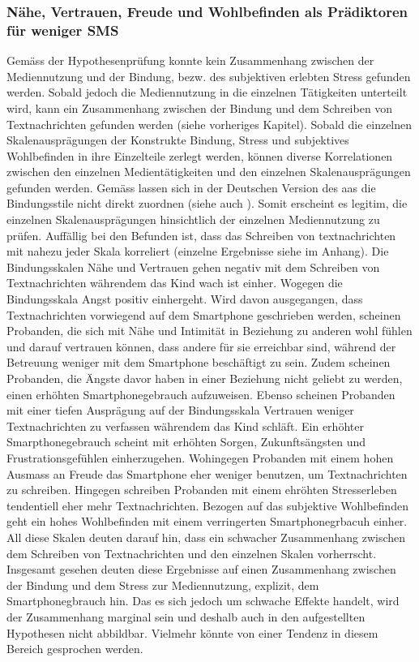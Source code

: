 \subsubsection{Nähe, Vertrauen, Freude und Wohlbefinden als Prädiktoren für weniger SMS}
Gemäss der Hypothesenprüfung konnte kein Zusammenhang zwischen der Mediennutzung und der Bindung, bezw. des subjektiven erlebten Stress gefunden werden. Sobald jedoch die Mediennutzung in die einzelnen Tätigkeiten unterteilt wird, kann ein Zusammenhang zwischen der Bindung und dem Schreiben von Textnachrichten gefunden werden (siehe vorheriges Kapitel). Sobald die einzelnen Skalenausprägungen der Konstrukte Bindung, Stress und subjektives Wohlbefinden in ihre Einzelteile zerlegt werden, können diverse Korrelationen zwischen den einzelnen Medientätigkeiten und den einzelnen Skalenausprägungen gefunden werden. Gemäss  lassen sich in der Deutschen Version des \acrshort{aas} die Bindungsstile nicht direkt zuordnen (siehe auch \textit{}). Somit erscheint es legitim, die einzelnen Skalenausprägungen hinsichtlich der einzelnen Mediennutzung zu prüfen. Auffällig bei den Befunden ist, dass das Schreiben von textnachrichten mit nahezu jeder Skala korreliert (einzelne Ergebnisse siehe  im Anhang). Die Bindungsskalen Nähe und Vertrauen gehen negativ mit dem Schreiben von Textnachrichten währendem das Kind wach ist einher. Wogegen die Bindungsskala Angst positiv einhergeht. Wird davon ausgegangen, dass Textnachrichten vorwiegend auf dem Smartphone geschrieben werden, scheinen Probanden, die sich mit Nähe und Intimität in Beziehung zu anderen wohl fühlen und darauf vertrauen können, dass andere für sie erreichbar sind, während der Betreuung weniger mit dem Smartphone beschäftigt zu sein. Zudem scheinen Probanden, die Ängste davor haben in einer Beziehung nicht geliebt zu werden, einen erhöhten Smartphonegebrauch aufzuweisen. Ebenso scheinen Probanden mit einer tiefen Ausprägung auf der Bindungsskala Vertrauen weniger Textnachrichten zu verfassen währendem das Kind schläft. Ein erhöhter Smarpthonegebrauch scheint mit erhöhten Sorgen, Zukunftsängsten und Frustrationsgefühlen einherzugehen. Wohingegen Probanden mit einem hohen Ausmass an Freude das Smartphone eher weniger benutzen, um Textnachrichten zu schreiben. Hingegen schreiben Probanden mit einem ehröhten Stresserleben tendentiell eher mehr Textnachrichten. Bezogen auf das subjektive Wohlbefinden geht ein hohes Wohlbefinden mit einem verringerten Smartphonegrbacuh einher. All diese Skalen deuten darauf hin, dass ein schwacher Zusammenhang zwischen dem Schreiben von Textnachrichten und den einzelnen Skalen vorherrscht. Insgesamt gesehen deuten diese Ergebnisse auf einen Zusammenhang zwischen der Bindung und dem Stress zur Mediennutzung, explizit, dem Smartphonegbrauch hin. Das es sich jedoch um schwache Effekte handelt, wird der Zusammenhang marginal sein und deshalb auch in den aufgestellten Hypothesen nicht abbildbar. Vielmehr könnte von einer Tendenz in diesem Bereich gesprochen werden.  


